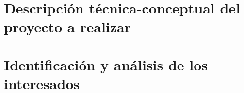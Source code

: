 \documentclass[11pt]{proyecto}
\begin{document}
\section{Descripción técnica-conceptual del proyecto a realizar}
\label{sec:descripcion}








\section{Identificación y análisis de los interesados}
\label{sec:interesados}

 
 
 

\end{document}
